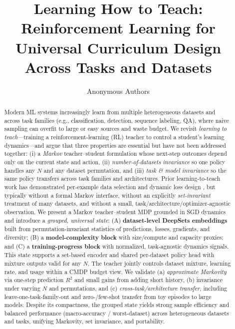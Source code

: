 \documentclass[11pt]{article}
\title{\textbf{Learning How to Teach: \\Reinforcement Learning for Universal Curriculum Design Across Tasks and Datasets}}
\author{Anonymous Authors}
\date{}
\newcommand{\1}{\mathbf{1}}
\begin{document}
\maketitle

\begin{abstract}
Modern ML systems increasingly learn from multiple heterogeneous datasets and across task families (e.g., classification, detection, sequence labeling, QA), where naive sampling can overfit to large or easy sources and waste budget. We revisit \emph{learning to teach}---training a reinforcement-learning (RL) teacher to control a student's learning dynamics---and argue that three properties are essential but have not been addressed together: (i) a \emph{Markov} teacher--student formulation whose next-step outcomes depend only on the current state and action, (ii) \emph{number-of-datasets invariance} so one policy handles any $N$ and any dataset permutation, and (iii) \emph{task \& model invariance} so the same policy transfers across task families and architectures. Prior learning-to-teach work has demonstrated per-example data selection and dynamic loss design \citep{fan2018l2t,wu2018l2tloss}, but typically without a formal Markov interface, without an explicitly \emph{set-invariant} treatment of many datasets, and without a small, task/architecture/optimizer-agnostic observation.
We present a Markov teacher--student MDP grounded in SGD dynamics and introduce a \emph{grouped, universal state}: (A) \textbf{dataset-level DeepSets embeddings} built from permutation-invariant statistics of predictions, losses, gradients, and diversity; (B) a \textbf{model-complexity block} with size/compute and capacity proxies; and (C) a \textbf{training-progress block} with normalized, task-agnostic dynamics signals. This state supports a set-based encoder and shared per-dataset policy head with mixture outputs valid for any $N$. The teacher jointly controls dataset mixture, learning rate, and usage within a CMDP budget view. We validate (a) \emph{approximate Markovity} via one-step prediction $R^2$ and small gains from adding short history, (b) invariance under varying $N$ and permutations, and (c) \emph{cross-task/architecture transfer}, including leave-one-task-family-out and zero-/few-shot transfer from toy episodes to large models. Despite its compactness, the grouped state yields strong sample efficiency and balanced performance (macro-accuracy / worst-dataset) across heterogeneous datasets and tasks, unifying Markovity, set invariance, and portability.
\end{abstract}
\end{document}
